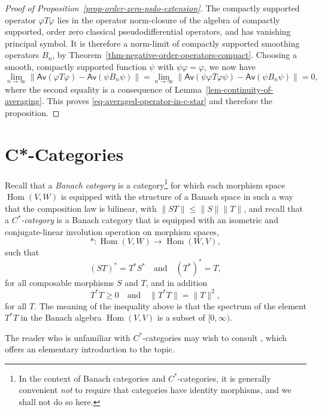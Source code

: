 \documentclass[leqno,11pt]{amsart}
\numberwithin{equation}{subsection}
\theoremstyle{plain}
\theoremstyle{definition}
\theoremstyle{remark}
\DeclareMathOperator{\Hom}{Hom}
\begin{document}
\begin{proof}[Proof of Proposition~\ref{prop-order-zero-psdo-extension}]
The compactly supported operator $\varphi T\varphi$ lies in the operator norm-closure  of the algebra of compactly supported, order zero classical pseudodifferential operators, and has vanishing principal symbol.  It is therefore a norm-limit of compactly supported smoothing operators $B_n$, by Theorem~\ref{thm-negative-order-operators-compact}.   Choosing a smooth, compactly supported function $\psi$ with $\psi \varphi = \varphi$, we now have 
\[
\lim_{n\to \infty}\bigl \| \mathsf{Av}( \varphi T \varphi) - \mathsf{Av}( \psi B_n \psi) \bigr \| 
= \lim_{n\to \infty} \bigl \| \mathsf{Av}( \psi \varphi T \varphi\psi ) - \mathsf{Av}( \psi B_n \psi) \bigr \| 
 =  0,
\]
where the second equality is a consequence of Lemma~\ref{lem-continuity-of-averaging}. This proves \eqref{eq-averaged-operator-in-c-star} and therefore the proposition.
\end{proof}




\section{C*-Categories}
\label{subsec-category-of-psdos}

Recall that a \emph{Banach category} is a category\footnote{In the context of Banach categories and $C^*$-categories, it is generally convenient \emph{not} to require that categories have identity morphisms, and we shall not do so here.}  for which each morphism space $\Hom(V,W)$ is equipped with the structure of a Banach space in such a way that the composition law is bilinear, with $\|S   T\|\le \| S\|\| T\|$, and recall that a \emph{$C^*$-category} is a Banach category that is equipped with an isometric and conjugate-linear involution operation on morphism spaces,
\[
\ast: \Hom(V,W) \longrightarrow \Hom(W,V),
\]
 such that
\[
(S   T)^{*} = T^{*}  S^{*}\quad \text{and} \quad  (T^{*})^{*} = T,
\]
for all composable morphisms $S$ and $T$, and in addition 
\[
T^*T\ge 0  \quad \text{and} \quad \| T^*T \| = \| T\|^2 ,
\]
for all $T$.  The meaning of the inequality above is that  the spectrum of the element $T^*T$  in the Banach algebra $\Hom (V,V)$ is a subset of $[0,\infty)$.  

The reader who is unfamiliar with $C^*$-categories may wish to consult \cite{MitchenerCategories02}, which offers an elementary introduction to the topic.  
\end{document}
